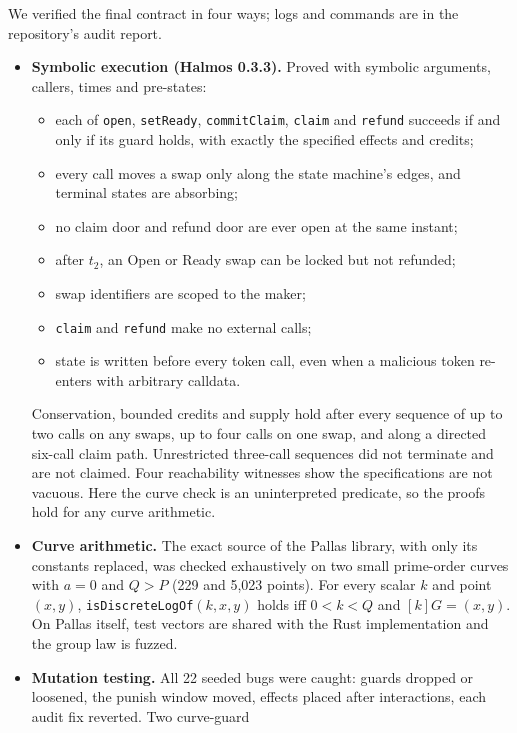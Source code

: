 \documentclass[10pt,letterpaper]{article}
\makeatletter
\renewcommand\subsection{\@startsection{subsection}{2}{\z@}{-0.9em}{0.25em}{\normalfont\normalsize\bfseries}}
\theoremstyle{plain}
\theoremstyle{definition}
\newcommand{\fn}[1]{\texttt{#1}}
\newcommand{\st}[1]{\textsf{#1}}
\makeatother
\begin{document}
\subsection{The escrow contract}
We verified the final contract in four ways; logs and commands are in the repository's audit
report.
\begin{itemize}\setlength\itemsep{0.1em}
\item \textbf{Symbolic execution (Halmos 0.3.3).} Proved with symbolic arguments, callers, times
and pre-states:
\begin{itemize}\setlength\itemsep{0.05em}
\item each of \fn{open}, \fn{setReady}, \fn{commitClaim}, \fn{claim} and \fn{refund} succeeds if
and only if its guard holds, with exactly the specified effects and credits;
\item every call moves a swap only along the state machine's edges, and terminal states are
absorbing;
\item no claim door and refund door are ever open at the same instant;
\item after $t_2$, an \st{Open} or \st{Ready} swap can be locked but not refunded;
\item swap identifiers are scoped to the maker;
\item \fn{claim} and \fn{refund} make no external calls;
\item state is written before every token call, even when a malicious token re-enters with
arbitrary calldata.
\end{itemize}
Conservation, bounded credits and supply hold after every sequence of up to two calls on any
swaps, up to four calls on one swap, and along a directed six-call claim path. Unrestricted
three-call sequences did not terminate and are not claimed. Four reachability witnesses show the
specifications are not vacuous. Here the curve check is an uninterpreted predicate, so the proofs
hold for any curve arithmetic.
\item \textbf{Curve arithmetic.} The exact source of the Pallas library, with only its constants
replaced, was checked exhaustively on two small prime-order curves with $a=0$ and $Q>P$ (229 and
5{,}023 points). For every scalar $k$ and point $(x,y)$, \fn{isDiscreteLogOf}$(k,x,y)$ holds iff
$0<k<Q$ and $[k]G=(x,y)$. On Pallas itself, test vectors are shared with the Rust implementation
and the group law is fuzzed.
\item \textbf{Mutation testing.} All 22 seeded bugs were caught: guards dropped or loosened, the
punish window moved, effects placed after interactions, each audit fix reverted. Two curve-guard

\end{itemize}
\end{document}

